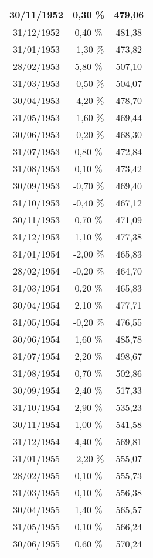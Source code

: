 \begin{center}
\begin{longtable}{|c|c|c|}
30/11/1952 & 0,30 \% & 479,06  \\ \hline
31/12/1952 & 0,40 \% & 481,38  \\ \hline
31/01/1953 & -1,30 \% & 473,82  \\ \hline
28/02/1953 & 5,80 \% & 507,10  \\ \hline
31/03/1953 & -0,50 \% & 504,07  \\ \hline
30/04/1953 & -4,20 \% & 478,70  \\ \hline
31/05/1953 & -1,60 \% & 469,44  \\ \hline
30/06/1953 & -0,20 \% & 468,30  \\ \hline
31/07/1953 & 0,80 \% & 472,84  \\ \hline
31/08/1953 & 0,10 \% & 473,42  \\ \hline
30/09/1953 & -0,70 \% & 469,40  \\ \hline
31/10/1953 & -0,40 \% & 467,12  \\ \hline
30/11/1953 & 0,70 \% & 471,09  \\ \hline
31/12/1953 & 1,10 \% & 477,38  \\ \hline
31/01/1954 & -2,00 \% & 465,83  \\ \hline
28/02/1954 & -0,20 \% & 464,70  \\ \hline
31/03/1954 & 0,20 \% & 465,83  \\ \hline
30/04/1954 & 2,10 \% & 477,71  \\ \hline
31/05/1954 & -0,20 \% & 476,55  \\ \hline
30/06/1954 & 1,60 \% & 485,78  \\ \hline
31/07/1954 & 2,20 \% & 498,67  \\ \hline
31/08/1954 & 0,70 \% & 502,86  \\ \hline
30/09/1954 & 2,40 \% & 517,33  \\ \hline
31/10/1954 & 2,90 \% & 535,23  \\ \hline
30/11/1954 & 1,00 \% & 541,58  \\ \hline
31/12/1954 & 4,40 \% & 569,81  \\ \hline
31/01/1955 & -2,20 \% & 555,07  \\ \hline
28/02/1955 & 0,10 \% & 555,73  \\ \hline
31/03/1955 & 0,10 \% & 556,38  \\ \hline
30/04/1955 & 1,40 \% & 565,57  \\ \hline
31/05/1955 & 0,10 \% & 566,24  \\ \hline
30/06/1955 & 0,60 \% & 570,24  \\ \hline

\end{longtable}
\end{center}
